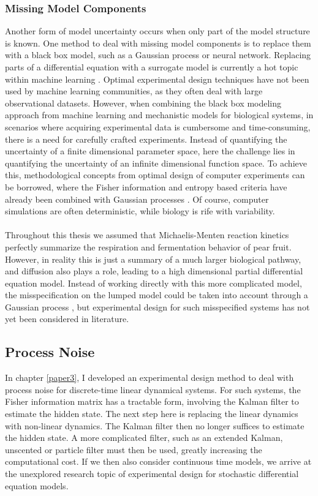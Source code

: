 \subsubsection{Missing Model Components}
Another form of model uncertainty occurs when only part of the model structure is known. One method to deal with missing model components is to replace them with a black box model, such as a Gaussian process or neural network. Replacing parts of a differential equation with a surrogate model is currently a hot topic within machine learning \parencite{rackauckas3,rackauckas4}. Optimal experimental design techniques have not been used by machine learning communities, as they often deal with large observational datasets. However, when combining the black box modeling approach from machine learning and mechanistic models for biological systems, in scenarios where acquiring experimental data is cumbersome and time-consuming, there is a need for carefully crafted experiments. Instead of quantifying the uncertainty of a finite dimensional parameter space, here the challenge lies in quantifying the uncertainty of an infinite dimensional function space. To achieve this, methodological concepts from optimal design of computer experiments can be borrowed, where the Fisher information and entropy based criteria have already been combined with Gaussian processes \parencite{santner}. Of course, computer simulations are often deterministic, while biology is rife with variability.
\\
\\
Throughout this thesis we assumed that Michaelis-Menten reaction kinetics perfectly summarize the respiration and fermentation behavior of pear fruit. However, in reality this is just a summary of a much larger biological pathway, and diffusion also plays a role, leading to a high dimensional partial differential equation model. Instead of working directly with this more complicated model, the misspecification on the lumped model could be taken into account through a Gaussian process \parencite{kennedy}, but experimental design for such misspecified systems has not yet been considered in literature.
\subsection{Process Noise}
In chapter \ref{paper3}, I developed an experimental design method to deal with process noise for discrete-time linear dynamical systems. For such systems, the Fisher information matrix has a tractable form, involving the Kalman filter to estimate the hidden state. The next step here is replacing the linear dynamics with non-linear dynamics. The Kalman filter then no longer suffices to estimate the hidden state. A more complicated filter, such as an extended Kalman, unscented or particle filter must then be used, greatly increasing the computational cost. If we then also consider continuous time models, we arrive at the unexplored research topic of experimental design for stochastic differential equation models.
